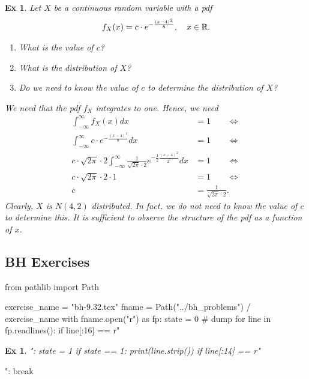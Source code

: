 \documentclass[a4paper,11pt]{article}
\newtheorem{exercise}[theorem]{Ex}
\begin{document}
\begin{exercise}
Let $X$ be a continuous random variable with a pdf
\begin{align}
    f_X(x) = c \cdot e^{-\frac{(x - 4)^2}{8}}, \quad x \in \mathbb{R}.
\end{align}
\begin{enumerate}
    \item What is the value of $c$?
    \item What is the distribution of $X$?
    \item Do we need to know the value of $c$ to determine the distribution of $X$?
\end{enumerate}
\begin{solution}
We need that the pdf $f_X$ integrates to one. Hence, we need
\begin{align}
    \int_{-\infty}^\infty f_X(x) dx &= 1 \qquad \iff \\
    \int_{-\infty}^\infty c \cdot e^{-\frac{(x - 4)^2}{8}} dx &= 1 \qquad \iff \\
    c \cdot \sqrt{2\pi}\cdot 2 \int_{-\infty}^\infty  \frac{1}{\sqrt{2\pi}\cdot 2} e^{-\frac{1}{2}\frac{(x - 4)^2}{2^2}} dx &= 1 \qquad \iff \\
    c \cdot \sqrt{2\pi}\cdot 2 \cdot 1 &= 1 \qquad \iff \\
    c &= \frac{1}{\sqrt{2\pi}\cdot 2}.
\end{align}
Clearly, $X$ is $N(4,2)$ distributed. In fact, we do not need to know the value of $c$ to determine this. It is sufficient to observe the structure of the pdf as a function of $x$.
\end{solution}
\end{exercise}


\subsection{BH Exercises}


\begin{pycode}
from pathlib import Path

exercise_name = "bh-9.32.tex"
fname = Path("../bh_problems") / exercise_name
with fname.open("r") as fp:
    state = 0  # dump
    for line in fp.readlines():
        if line[:16] == r"\begin{exercise}":
            state = 1
        if state == 1:
            print(line.strip())
        if line[:14] == r"\end{exercise}":
            break
\end{pycode}
\end{document}
